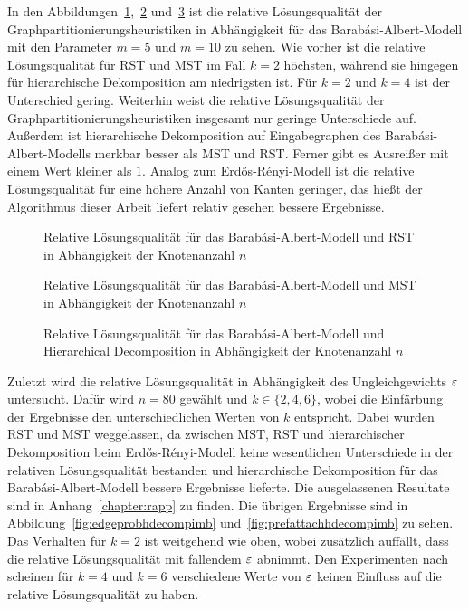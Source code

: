 \vfill\clearpage

In den Abbildungen~\ref{fig:prefattachrstnode},~\ref{fig:prefattachmstnode} und~\ref{fig:prefattachhdecompnode} ist die relative Lösungsqualität der Graphpartitionierungsheuristiken in Abhängigkeit für das Barabási-Albert-Modell mit den Parameter $m=5$ und $m=10$ zu sehen.
Wie vorher ist die relative Lösungsqualität für RST und MST im Fall $k=2$ höchsten, während sie hingegen für hierarchische Dekomposition am niedrigsten ist.
Für $k=2$ und $k=4$ ist der Unterschied gering.
Weiterhin weist die relative Lösungsqualität der Graphpartitionierungsheuristiken insgesamt nur geringe Unterschiede auf.
Außerdem ist hierarchische Dekomposition auf Eingabegraphen des Barabási-Albert-Modells merkbar besser als MST und RST.
Ferner gibt es Ausreißer mit einem Wert kleiner als $1$.
Analog zum Erdős-Rényi-Modell ist die relative Lösungsqualität für eine höhere Anzahl von Kanten geringer, das hießt der Algorithmus dieser Arbeit liefert relativ gesehen bessere Ergebnisse.

\begin{figure}[H]
    \centering
    
    \caption{Relative Lösungsqualität für das Barabási-Albert-Modell und RST in Abhängigkeit der Knotenanzahl $n$\label{fig:prefattachrstnode}}
\end{figure}

\begin{figure}[H]
    \centering
    
    \caption{Relative Lösungsqualität für das Barabási-Albert-Modell und MST in Abhängigkeit der Knotenanzahl $n$\label{fig:prefattachmstnode}}
\end{figure}

\begin{figure}[H]
    \centering
    
    \caption{Relative Lösungsqualität für das Barabási-Albert-Modell und Hierarchical Decomposition in Abhängigkeit der Knotenanzahl $n$\label{fig:prefattachhdecompnode}}
\end{figure}

\vfill\clearpage

Zuletzt wird die relative Lösungsqualität in Abhängigkeit des Ungleichgewichts $\varepsilon$ untersucht.
Dafür wird $n=80$ gewählt und $k \in \{2, 4, 6\}$, wobei die Einfärbung der Ergebnisse den unterschiedlichen Werten von $k$ entspricht.
Dabei wurden RST und MST weggelassen, da zwischen MST, RST und hierarchischer Dekomposition beim Erdős-Rényi-Modell keine wesentlichen Unterschiede in der relativen Lösungsqualität bestanden und hierarchische Dekomposition für das Barabási-Albert-Modell bessere Ergebnisse lieferte.
Die ausgelassenen Resultate sind in Anhang~\ref{chapter:rapp} zu finden.
Die übrigen Ergebnisse sind in Abbildung~\ref{fig:edgeprobhdecompimb} und~\ref{fig:prefattachhdecompimb} zu sehen.
Das Verhalten für $k=2$ ist weitgehend wie oben, wobei zusätzlich auffällt, dass die relative Lösungsqualität mit fallendem $\varepsilon$ abnimmt.
Den Experimenten nach scheinen für $k=4$ und $k=6$ verschiedene Werte von $\varepsilon$ keinen Einfluss auf die relative Lösungsqualität zu haben.


